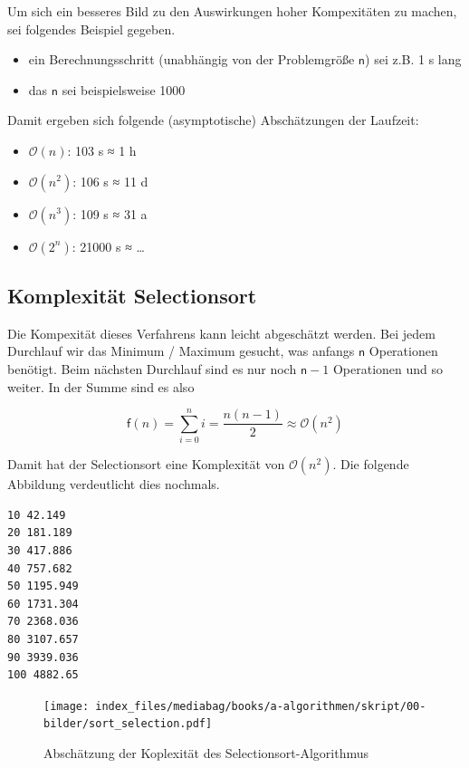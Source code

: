 \documentclass[
  letterpaper,
  DIV=11,
  numbers=noendperiod]{scrreprt}
\providecommand{\tightlist}{%
  \setlength{\itemsep}{0pt}\setlength{\parskip}{0pt}}\usepackage{longtable,booktabs,array}
\begin{document}
Um sich ein besseres Bild zu den Auswirkungen hoher Kompexitäten zu
machen, sei folgendes Beispiel gegeben.

\begin{itemize}
\tightlist
\item
  ein Berechnungsschritt (unabhängig von der Problemgröße \(\mathsf n\))
  sei z.B. 1 s lang
\item
  das \(\mathsf n\) sei beispielsweise 1000
\end{itemize}

Damit ergeben sich folgende (asymptotische) Abschätzungen der Laufzeit:

\begin{itemize}
\tightlist
\item
  \(\mathcal{O}(n)\): 103 s ≈ 1 h
\item
  \(\mathcal{O}(n^2)\): 106 s ≈ 11 d
\item
  \(\mathcal{O}(n^3)\): 109 s ≈ 31 a
\item
  \(\mathcal{O}(2^n)\): 21000 s ≈ \ldots{}
\end{itemize}

\subsection{Komplexität
Selectionsort}\label{komplexituxe4t-selectionsort}

Die Kompexität dieses Verfahrens kann leicht abgeschätzt werden. Bei
jedem Durchlauf wir das Minimum / Maximum gesucht, was anfangs
\(\mathsf n\) Operationen benötigt. Beim nächsten Durchlauf sind es nur
noch \(\mathsf n − 1\) Operationen und so weiter. In der Summe sind es
also

\[ \mathsf f(n) = \sum_{i=0}^n i = \frac{n(n-1)}{2} \approx \mathcal{O}(n^2) \]

Damit hat der Selectionsort eine Komplexität von \(\mathcal{O}(n^2)\).
Die folgende Abbildung verdeutlicht dies nochmals.

\begin{verbatim}
10 42.149
20 181.189
30 417.886
40 757.682
50 1195.949
60 1731.304
70 2368.036
80 3107.657
90 3939.036
100 4882.65
\end{verbatim}

\begin{figure}[H]

{\centering \texttt{[image: index\_files/mediabag/books/a-algorithmen/skript/00-bilder/sort\_selection.pdf]}

}

\caption{Abschätzung der Koplexität des Selectionsort-Algorithmus}

\end{figure}%
\end{document}
